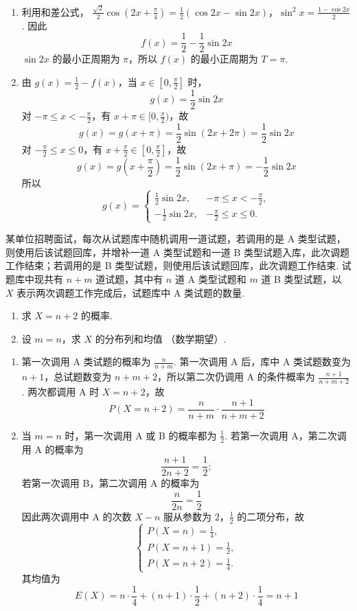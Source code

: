 \begin{solution}
\begin{enumerate}
\item 利用和差公式，
\(\frac{\sqrt2}{2}\cos\left(2x+\frac{\pi}{4}\right) =\frac12\left(\cos2x-\sin2x\right)\)，\(\sin^2x=\frac{1-\cos2x}{2}\).
因此
\[
f(x)=\frac12-\frac12\sin2x
\]
\(\sin2x\) 的最小正周期为 \(\pi\)，所以 \(f(x)\) 的最小正周期为 \(T=\pi\).
\item 由 \(g(x)=\frac12-f(x)\)，当 \(x\in[0,\frac{\pi}{2}]\) 时，
\[
g(x)=\frac12\sin2x
\]
对 \(-\pi\leqslant x<-\frac{\pi}{2}\)，有 \(x+\pi\in[0,\frac{\pi}{2})\)，故
\[
g(x)=g(x+\pi)=\frac12\sin(2x+2\pi)=\frac12\sin2x
\]
对 \(-\frac{\pi}{2}\leqslant x\leqslant0\)，有 \(x+\frac{\pi}{2}\in[0,\frac{\pi}{2}]\)，故
\[
g(x)=g\left(x+\frac{\pi}{2}\right)
=\frac12\sin\left(2x+\pi\right)
=-\frac12\sin2x
\]
所以
\[
g(x)=
\begin{cases}
\frac12\sin2x,&-\pi\leqslant x<-\frac{\pi}{2},\\
-\frac12\sin2x,&-\frac{\pi}{2}\leqslant x\leqslant0.
\end{cases}
\]
\end{enumerate}
\end{solution}

\begin{problem}
某单位招聘面试，每次从试题库中随机调用一道试题，若调用的是 A 类型试题，则使用后该试题回库，并增补一道 A 类型试题和一道 B 类型试题入库，此次调题工作结束；若调用的是 B 类型试题，则使用后该试题回库，此次调题工作结束. 试题库中现共有 \( n + m \) 道试题，其中有 \(n\) 道 A 类型试题和 \(m\) 道 B 类型试题，以 \(X\) 表示两次调题工作完成后，试题库中 A 类试题的数量.

\begin{enumerate}
\item 求 \(X = n + 2\) 的概率.
\item 设 \(m = n\)，求 \(X\) 的分布列和均值 （数学期望）.
\end{enumerate}
\end{problem}

\begin{solution}
\begin{enumerate}
\item 第一次调用 A 类试题的概率为 \(\frac{n}{n+m}\). 第一次调用 A 后，库中 A 类试题数变为 \(n+1\)，总试题数变为 \(n+m+2\)，所以第二次仍调用 A 的条件概率为 \(\frac{n+1}{n+m+2}\). 两次都调用 A 时 \(X=n+2\)，故
\[
P(X=n+2)=\frac{n}{n+m}\cdot\frac{n+1}{n+m+2}
\]
\item 当 \(m=n\) 时，第一次调用 A 或 B 的概率都为 \(\frac12\). 若第一次调用 A，第二次调用 A 的概率为
\[
\frac{n+1}{2n+2}=\frac12;
\]
若第一次调用 B，第二次调用 A 的概率为
\[
\frac{n}{2n}=\frac12
\]
因此两次调用中 A 的次数 \(X-n\) 服从参数为 \(2\)，\(\frac12\) 的二项分布，故
\[
\begin{cases}
P(X=n)=\frac14,\\
P(X=n+1)=\frac12,\\
P(X=n+2)=\frac14.
\end{cases}
\]
其均值为
\[
E(X)=n\cdot\frac14+(n+1)\cdot\frac12+(n+2)\cdot\frac14=n+1
\]
\end{enumerate}
\end{solution}

